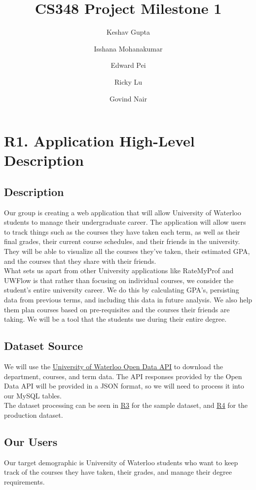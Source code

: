 \documentclass[12pt, a4paper]{article}
\title{CS348 Project Milestone 1}
\author{Keshav Gupta\and Isshana Mohanakumar \and Edward Pei \and Ricky Lu \and Govind Nair}
\begin{document}
\maketitle
\graphicspath{{./images/}}

\section*{R1. Application High-Level Description}
\label{sec:R1}
\subsection*{Description}
Our group is creating a web application that will allow University of Waterloo students to manage their undergraduate career. The application will allow users to track things such as the courses they have taken each term, as well as their final grades, their current course schedules, and their friends in the university. They will be able to visualize all the courses they've taken, their estimated GPA, and the courses that they share with their friends.\\

What sets us apart from other University applications like RateMyProf and UWFlow is that rather than focusing on individual courses, we consider the student's entire university career. We do this by calculating GPA's, persisting data from previous terms, and including this data in future analysis. We also help them plan courses based on pre-requisites and the courses their friends are taking. We will be a tool that the students use during their entire degree.

\subsection*{Dataset Source}
We will use the \underline{\href{https://openapi.data.uwaterloo.ca/api-docs/index.html}{University of Waterloo Open Data API}} to download the department, courses, and term data. The API responses provided by the Open Data API will be provided in a JSON format, so we will need to process it into our MySQL tables.\\

The dataset processing can be seen in \underline{\hyperref[sec:R3]{R3}} for the sample dataset, and \underline{\hyperref[sec:R4]{R4}} for the production dataset.

\subsection*{Our Users}
Our target demographic is University of Waterloo students who want to keep track of the courses they have taken, their grades, and manage their degree requirements.\\
\end{document}
